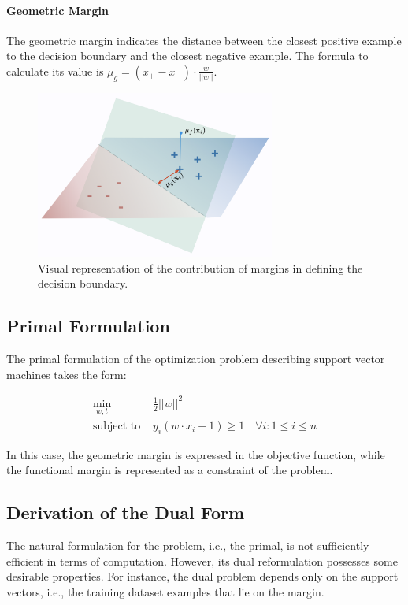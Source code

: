 \paragraph{Geometric Margin} The geometric margin indicates the distance between the closest positive example to the decision boundary and the closest negative example. The formula to calculate its value is $\mu_g=(x_+-x_-)\cdot\frac{w}{||w||}$.

\begin{figure}[H]
    \centering
    \includegraphics[width=0.7\textwidth]{figures/margins}
    \caption{Visual representation of the contribution of margins in defining the decision boundary.}
    \label{fig:svm-margins}
\end{figure}

\subsection{Primal Formulation}

The primal formulation of the optimization problem describing support vector machines takes the form:

\begin{align*}
    \min_{w, t}\ & \frac{1}{2}||w||^2 \\
    \text{subject to } & y_i(w \cdot x_i - 1)\geq 1 \quad \forall i:1\leq i\leq n
\end{align*}

In this case, the geometric margin is expressed in the objective function, while the functional margin is represented as a constraint of the problem.

\subsection{Derivation of the Dual Form}

The natural formulation for the problem, i.e., the primal, is not sufficiently efficient in terms of computation. However, its dual reformulation possesses some desirable properties. For instance, the dual problem depends only on the support vectors, i.e., the training dataset examples that lie on the margin.

